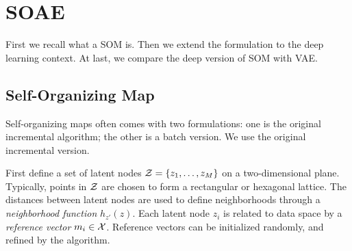 \section{SOAE}\label{sec:soae}

First we recall what a SOM is.
Then we extend the formulation to the deep learning context.
At last,
we compare the deep version of SOM with VAE\@.

\subsection{Self-Organizing Map}

Self-organizing maps often comes with two formulations:
one is the original incremental algorithm;
the other is a batch version.
We use the original incremental version.

First define a set of latent nodes
\( \mathcal{Z}=\{z_1,\dots,z_M\} \)
on a two-dimensional plane.
Typically,
points in \( \mathcal{Z} \) are chosen to form a rectangular or hexagonal lattice.
The distances between latent nodes are used to define neighborhoods
through a \emph{neighborhood function} \( h_{z'}(z) \).
Each latent node \( z_i \) is related to data space by a \emph{reference vector}
\( m_i\in\mathcal{X} \).
Reference vectors can be initialized randomly,
and refined by the algorithm.
